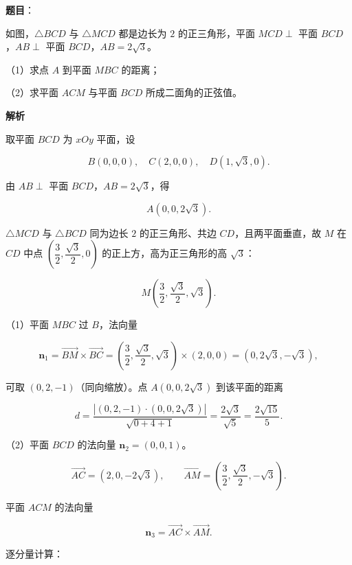 \begin{answer}

\textbf{题目}：

如图，$\triangle BCD$ 与 $\triangle MCD$ 都是边长为 $2$ 的正三角形，平面 $MCD\perp$ 平面 $BCD$，$AB\perp$ 平面 $BCD$，$AB=2\sqrt3$。

（1）求点 $A$ 到平面 $MBC$ 的距离；

（2）求平面 $ACM$ 与平面 $BCD$ 所成二面角的正弦值。
\nopagebreak[4]
\begin{center}\end{center}
\nopagebreak[4]
\textbf{解析}

取平面 $BCD$ 为 $xOy$ 平面，设

\nopagebreak[4]
\[B(0,0,0),\quad C(2,0,0),\quad D(1,\sqrt3,0).\]

由 $AB\perp$ 平面 $BCD$，$AB=2\sqrt3$，得

\nopagebreak[4]
\[A(0,0,2\sqrt3).\]

$\triangle MCD$ 与 $\triangle BCD$ 同为边长 $2$ 的正三角形、共边 $CD$，且两平面垂直，故 $M$ 在 $CD$ 中点 $\left(\dfrac32,\dfrac{\sqrt3}2,0\right)$ 的正上方，高为正三角形的高 $\sqrt3$：

\nopagebreak[4]
\[M\left(\frac32,\frac{\sqrt3}2,\sqrt3\right).\]

（1）平面 $MBC$ 过 $B$，法向量

\nopagebreak[4]
\[\boldsymbol n_1=\overrightarrow{BM}\times\overrightarrow{BC}
=\left(\frac32,\frac{\sqrt3}2,\sqrt3\right)\times(2,0,0)
=\left(0,2\sqrt3,-\sqrt3\right),\]

可取 $(0,2,-1)$（同向缩放）。点 $A(0,0,2\sqrt3)$ 到该平面的距离

\nopagebreak[4]
\[d=\frac{\left|(0,2,-1)\cdot(0,0,2\sqrt3)\right|}{\sqrt{0+4+1}}
=\frac{2\sqrt3}{\sqrt5}=\frac{2\sqrt{15}}5.\]

（2）平面 $BCD$ 的法向量 $\boldsymbol n_2=(0,0,1)$。

\nopagebreak[4]
\[\overrightarrow{AC}=(2,0,-2\sqrt3),\qquad
\overrightarrow{AM}=\left(\frac32,\frac{\sqrt3}2,-\sqrt3\right).\]

平面 $ACM$ 的法向量

\nopagebreak[4]
\[\boldsymbol n_3=\overrightarrow{AC}\times\overrightarrow{AM}.\]

逐分量计算：


\end{answer}
